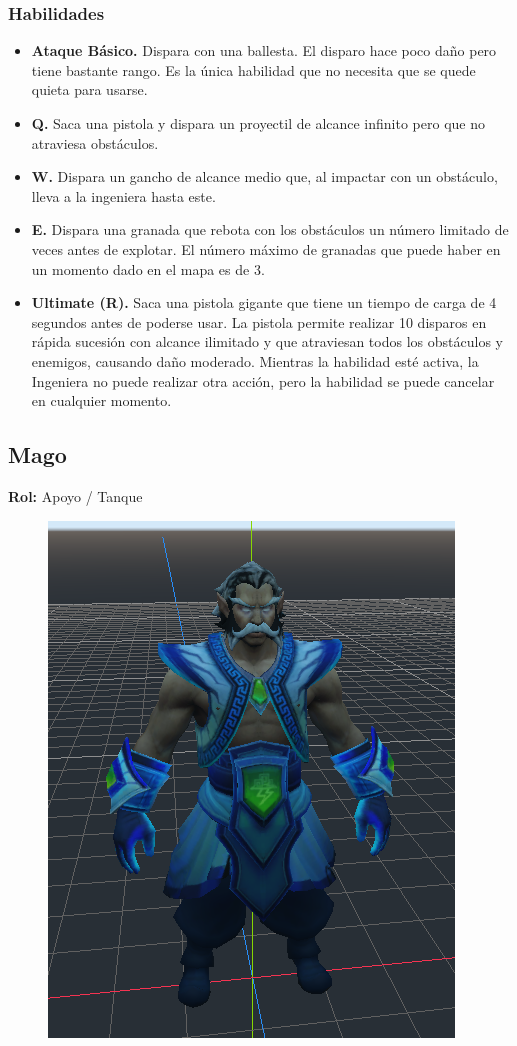 \subsubsection{Habilidades}
\begin{itemize}
\item \textbf{Ataque Básico.} Dispara con una ballesta. El disparo hace poco daño pero tiene bastante rango. Es la única habilidad que no necesita que se quede quieta para usarse.
\item \textbf{Q.} Saca una pistola y dispara un proyectil de alcance infinito pero que no atraviesa obstáculos.
\item \textbf{W.} Dispara un gancho de alcance medio que, al impactar con un obstáculo, lleva a la ingeniera hasta este.
\item \textbf{E.} Dispara una granada que rebota con los obstáculos un número limitado de veces antes de explotar. 
El número máximo de granadas que puede haber en un momento dado en el mapa es de 3.
\item \textbf{Ultimate (R).} Saca una pistola gigante que tiene un tiempo de carga de 4 segundos antes de poderse usar. La pistola permite realizar 10 disparos en rápida sucesión con alcance ilimitado y que atraviesan todos los obstáculos y enemigos, causando daño moderado. Mientras la habilidad esté activa, la Ingeniera no puede realizar otra acción, pero la habilidad se puede cancelar en cualquier momento.
\end{itemize}


\subsection{Mago}
\textbf{Rol:} Apoyo / Tanque

\begin{figure}[H]
	\centering
	\includegraphics[width=0.4\linewidth]{figures/MageModel.png}
	\label{fig:MageModel}
\end{figure}


